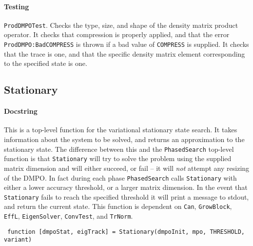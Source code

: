  \paragraph{Testing} \lstinline$ProdDMPOTest$. Checks the type, size, and shape of the density matrix product operator. It checks that compression is properly applied, and that the error \lstinline$ProdDMPO:BadCOMPRESS$ is thrown if a bad value of \lstinline$COMPRESS$ is supplied. It checks that the trace is one, and that the specific density matrix element corresponding to the specified state is one.
 
 \subsection{Stationary}
 \paragraph{Docstring} This is a top-level function for the variational stationary state search. It takes information about the system to be solved, and returns an approximation to the stationary state. The difference between this and the \lstinline$PhasedSearch$ top-level function is that \lstinline$Stationary$ will try to solve the problem using the supplied matrix dimension and will either succeed, or fail -- it will \emph{not} attempt any resizing of the DMPO. In fact during each phase \lstinline$PhasedSearch$ calls \lstinline$Stationary$ with either a lower accuracy threshold, or a larger matrix dimension. In the event that \lstinline$Stationary$ fails to reach the specified threshold it will print a message to stdout, and return the current state. This function is dependent on \lstinline$Can$, \lstinline$GrowBlock$, \lstinline$EffL$, \lstinline$EigenSolver$, \lstinline$ConvTest$, and \lstinline$TrNorm$.
 \begin{lstlisting}
 function [dmpoStat, eigTrack] = Stationary(dmpoInit, mpo, THRESHOLD, variant) \end{lstlisting}
